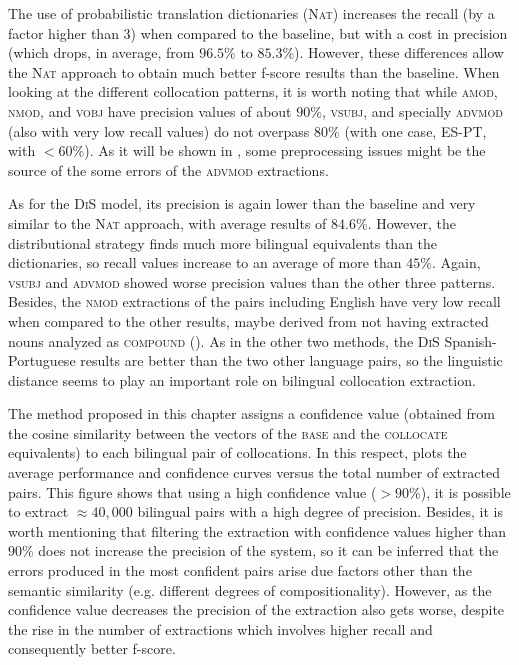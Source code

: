 \documentclass[output=paper
,modfonts
,nonflat]{langsci/langscibook}
\begin{document}
The use of probabilistic translation dictionaries (\textsc{Nat}) increases the recall
(by a factor higher than 3) when compared to the baseline, but with a cost in precision
(which drops, in average, from $96.5\%$ to $85.3\%$). However, these differences
allow the \textsc{Nat} approach to obtain much better f-score results than the
baseline. When looking at the different collocation patterns, it is worth noting
that while \textsc{amod, nmod}, and \textsc{vobj} have precision values of about $90\%$,
\textsc{vsubj}, and specially \textsc{advmod} (also with very low recall values)
do not overpass $80\%$ (with one case, ES-PT, with $<60\%$). As it will be shown
in , some preprocessing issues might be the source of the some
errors of the \textsc{advmod} extractions.

As for the \textsc{DiS} model, its precision is again lower than the baseline and very similar
to the \textsc{Nat} approach, with average results of $84.6\%$. However, the distributional
strategy finds much more bilingual equivalents than the dictionaries, so
recall values increase to an average of more than $45\%$. Again, \textsc{vsubj} and
\textsc{advmod} showed worse precision values than the other three patterns.
Besides, the \textsc{nmod} extractions of the pairs including English have very low recall
when compared to the other results, maybe derived from not having extracted nouns analyzed
as \textsc{compound} ().
As in the other two methods, the \textsc{DiS} Spanish-Portuguese results are better than the two
other language pairs, so the linguistic distance seems to play an important role on bilingual
collocation extraction.

The method proposed in this chapter assigns a confidence value (obtained from the cosine
similarity between the vectors of the \textsc{base} and the \textsc{collocate} equivalents)
to each bilingual pair of collocations. In this respect,  plots
the average performance and confidence curves versus the total number of extracted pairs.
This figure shows that using a high confidence value ($>90\%$), it is possible
to extract $\approx40,000$ bilingual pairs with a high degree of precision. Besides, it is
worth mentioning that filtering the extraction with confidence values higher than
$90\%$ does not increase the precision of the system, so it can be inferred that the errors
produced in the most confident pairs arise due factors other than the semantic similarity
(e.g. different degrees of compositionality). However, as the confidence value decreases
the precision of the extraction also gets worse, despite the rise in the number of extractions
which involves higher recall and consequently better f-score.
\end{document}
